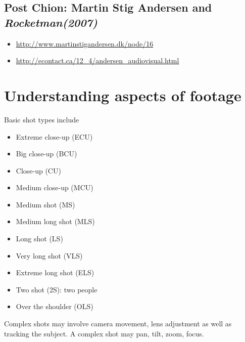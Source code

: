 \subsection{Post Chion: Martin Stig Andersen and \textit{Rocketman(2007)}}
\begin{itemize}
\item \url{http://www.martinstigandersen.dk/node/16}
\item \url{http://econtact.ca/12_4/andersen_audiovisual.html}
\end{itemize}

\section{Understanding aspects of footage}
Basic shot types include
\begin{itemize}
\item Extreme close-up (ECU)
\item Big close-up (BCU)
\item Close-up (CU)
\item Medium close-up (MCU)
\item Medium shot (MS)
\item Medium long shot (MLS)
\item Long shot (LS)
\item Very long shot (VLS)
\item Extreme long shot (ELS)
\item Two shot (2S): two people
\item Over the shoulder (OLS)
\end{itemize}

Complex shots may involve camera movement, lens adjustment as well as tracking the subject. A complex shot may pan, tilt, zoom, focus. 

